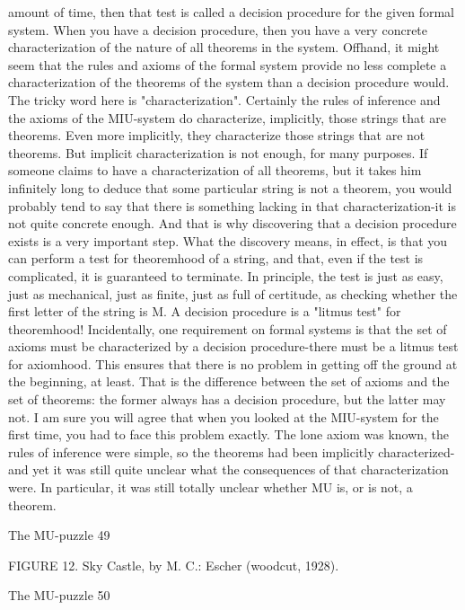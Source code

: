 amount of time, then that test is called a decision procedure for the given formal system.
         When you have a decision procedure, then you have a very concrete
characterization of the nature of all theorems in the system. Offhand, it might seem that
the rules and axioms of the formal system provide no less complete a characterization of
the theorems of the system than a decision procedure would. The tricky word here is
"characterization". Certainly the rules of inference and the axioms of the MIU-system do
characterize, implicitly, those strings that are theorems. Even more implicitly, they
characterize those strings that are not theorems. But implicit characterization is not
enough, for many purposes. If someone claims to have a characterization of all theorems,
but it takes him infinitely long to deduce that some particular string is not a theorem, you
would probably tend to say that there is something lacking in that characterization-it is
not quite concrete enough. And that is why discovering that a decision procedure exists is
a very important step. What the discovery means, in effect, is that you can perform a test
for theoremhood of a string, and that, even if the test is complicated, it is guaranteed to
terminate. In principle, the test is just as easy, just as mechanical, just as finite, just as full
of certitude, as checking whether the first letter of the string is M. A decision procedure
is a "litmus test" for theoremhood!
         Incidentally, one requirement on formal systems is that the set of axioms must be
characterized by a decision procedure-there must be a litmus test for axiomhood. This
ensures that there is no problem in getting off the ground at the beginning, at least. That
is the difference between the set of axioms and the set of theorems: the former always has
a decision procedure, but the latter may not.
         I am sure you will agree that when you looked at the MIU-system for the first
time, you had to face this problem exactly. The lone axiom was known, the rules of
inference were simple, so the theorems had been implicitly characterized-and yet it was
still quite unclear what the consequences of that characterization were. In particular, it
was still totally unclear whether MU is, or is not, a theorem.




The MU-puzzle                                                                                   49

                FIGURE 12. Sky Castle, by M. C.: Escher (woodcut, 1928).




The MU-puzzle                                                              50

